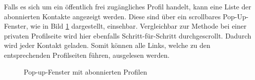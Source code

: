 		Falls es sich um ein öffentlich frei zugängliches Profil handelt, kann eine Liste der abonnierten Kontakte angezeigt werden. Diese sind über ein scrollbares Pop-Up-Fenster, wie in Bild \ref{img:instagram_abonniert} dargestellt, einsehbar. Vergleichbar zur Methode bei einer privaten Profilseite wird hier ebenfalls Schritt-für-Schritt durchgescrollt. Dadurch wird jeder Kontakt geladen. Somit können alle Links, welche zu den entsprechenden Profilseiten führen, ausgelesen werden. 
		
		
		
		\begin{figure}[H]
			\centering
			\caption{Pop-up-Fenster mit abonnierten Profilen}
			\label{img:instagram_abonniert}
		\end{figure}
		
